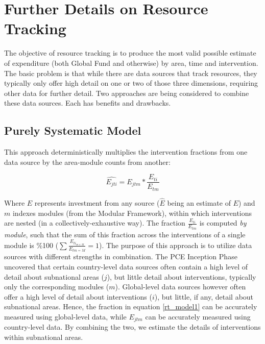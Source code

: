 \documentclass[twocolumn]{bmcart}%
\begin{document}
\section{Further Details on Resource Tracking} \label{resource_tracking}

The objective of resource tracking is to produce the most valid possible estimate of expenditure (both Global Fund and otherwise) by area, time and intervention. The basic problem is that while there are data sources that track resources, they typically only offer high detail on one or two of those three dimensions, requiring other data for further detail. Two approaches are being considered to combine these data sources. Each has benefits and drawbacks.

\subsection{Purely Systematic Model}

This approach deterministically multiplies the intervention fractions from one data source by the area-module counts from another:

\begin{equation} \label{rt_model1}
\widehat{E_{jti}}=E_{jtm}*\frac{E_{ti}}{E_{tm}}
\end{equation}

Where $E$ represents investment from any source ($\hat{E}$ being an estimate of $E$) and $m$ indexes modules (from the Modular Framework), within which interventions are nested (in a collectively-exhaustive way). The fraction $\frac{E_{ti}}{E_{tm}}$ is computed \textit{by module}, such that the sum of this fraction across the interventions of a single module is \%100 ($\sum \frac{E_{ti_{m\in M}}}{E_{tm=M}}=1$). The purpose of this approach is to utilize data sources with different strengths in combination. The PCE Inception Phase uncovered that certain country-level data sources often contain a high level of detail about subnational areas ($j$), but little detail about interventions, typically only the corresponding modules ($m$). Global-level data sources however often offer a high level of detail about interventions ($i$), but little, if any, detail about subnational areas. Hence, the fraction in equation \ref{rt_model1} can be accurately measured using global-level data, while $E_{jtm}$ can be accurately measured using country-level data. By combining the two, we estimate the details of interventions within subnational areas.\\
\end{document}
